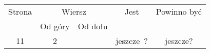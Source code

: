 \documentclass[a4paper,11pt]{article}
\numberwithin{equation}{section}
\begin{document}
{%






\newpage



\begin{center}

  \begin{tabular}{|c|c|c|c|c|}
    \hline
    Strona & \multicolumn{2}{c|}{Wiersz} & Jest
                              & Powinno być \\ \cline{2-3}
    & Od góry & Od dołu & & \\
    \hline
    11 & \hphantom{0}2 & & jeszcze~? & jeszcze? \\

\end{tabular}
\end{center}}
\end{document}
